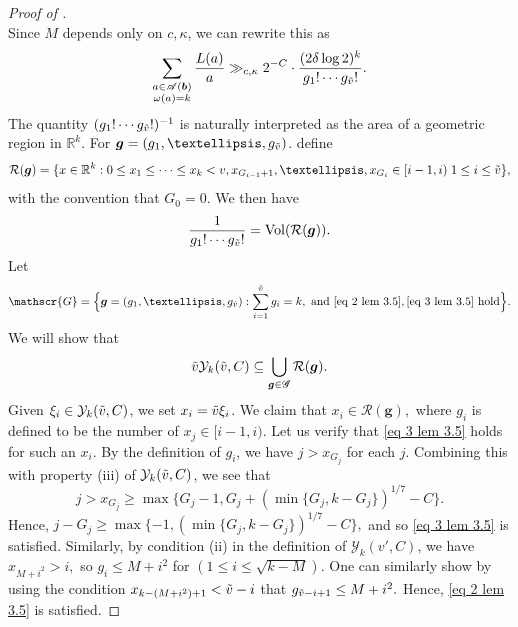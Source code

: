 \documentclass[10pt,a4paper]{amsart}
\newcommand{\R}{\mathbb{R}}
\DeclareMathOperator{\Vol}{Vol}
\newcommand{\density}{\delta}
\begin{document}
\begin{proof}[Proof of ]
\begin{equation*}
	\end{equation*}
	Since $M$ depends only on $c,\kappa$, we can rewrite this as
	\begin{equation}\label{L to factorials 2}
		\sum_{\substack{a \in \mathscr{A}(\bm{b}) \\ \omega(a) = k}} \frac{L(a)}{a} \gg_{c,\kappa} 2^{-C} \cdot \frac{(2 \density \log 2)^k}{g_1! \cdots g_{\Tilde{v}}!}.
	\end{equation}
	The quantity $(g_1! \cdots g_{\Tilde{v}}!)^{-1}$ is naturally interpreted as the area of a geometric region in $\R^k$. For $\bm{g} = (g_1, \dots, g_{\Tilde{v}})$. define
	$$\mathcal{R}(\bm{g}) = \{x \in \R^k : 0 \leq x_1 \leq \cdots \leq x_k <v , x_{G_{i-1}+1},\dots,x_{G_{i}} \in [i-1,i)\;1 \leq i \leq \Tilde{v}\},$$
	with the convention that $G_0 = 0$. We then have
	\begin{equation} \label{eq 3.5 lem 3.5}
		\frac{1}{g_1! \cdots g_{\Tilde{v}}!} = \Vol(\mathcal{R}(\bm{g})).
	\end{equation}
	Let $$\mathscr{G} = \Big\{\bm{g}=(g_1, \dots, g_{\Tilde{v}}): \sum_{i = 1}^{\Tilde{v}} g_i =k, \text{ and } \eqref{eq 2 lem 3.5}, \eqref{eq 3 lem 3.5}\text{ hold} \Big\}.$$
	We will show that
	\begin{equation}\label{eq 4 lem 3.5}
		\Tilde{v} \mathcal{Y}_k (\Tilde{v},C) \subseteq \bigcup_{\bm{g} \in \mathscr{G}} \mathcal{R}(\bm{g}).
	\end{equation}
	Given $\xi_i \in \mathcal{Y}_k(\Tilde{v},C)$, we set $x_i = \Tilde{v}\xi_i$. We claim that $x_i \in \mathcal{R}(\bm{g}),$ where $g_i$ is defined to be the number of $x_j \in [i-1,i)$. Let us verify that \eqref{eq 3 lem 3.5} holds for such an $x_i$. By the definition of $g_i$, we have $j > x_{G_j}$ for each $j$. Combining this with property (iii) of $\mathcal{Y}_k(\Tilde{v},C)$, we see that
	$$j > x_{G_j} \geq \max\{G_j-1, G_j + (\min\{G_j,k-G_j\})^{1/7} -C\}.$$
	Hence, $j - G_j \geq \max\{-1,(\min\{G_j,k-G_j\})^{1/7}-C\},$
	and so \eqref{eq 3 lem 3.5} is satisfied. Similarly, by condition (ii) in the definition of $\mathcal{Y}_k(v',C)$, we have $x_{M+i^2} > i,$ so $g_i \leq M+i^2$ for $(1 \leq i \leq \sqrt{k-M})$. One can similarly show by using the condition $x_{k-(M+i^2)+1} < \Tilde{v}-i$ that $g_{\Tilde{v}-i+1} \leq M+i^2.$ Hence, \eqref{eq 2 lem 3.5} is satisfied. 
	

\end{proof}
\end{document}
